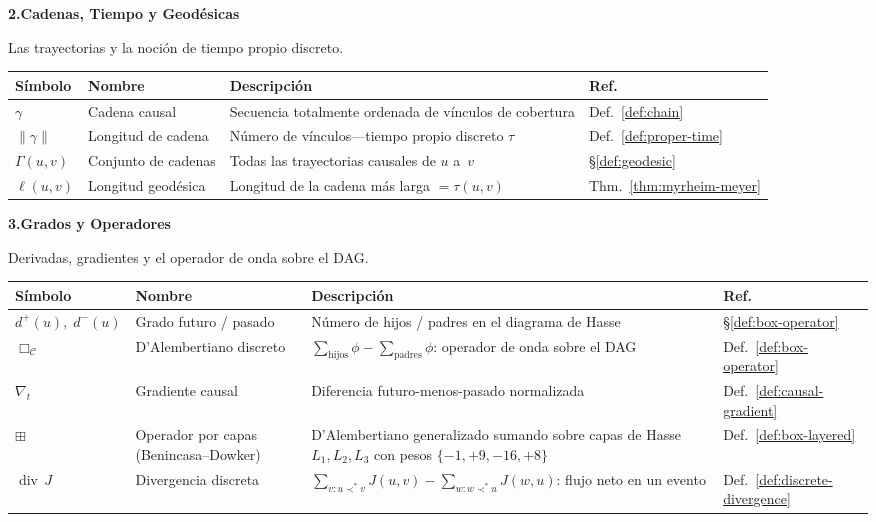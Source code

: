 \documentclass[11pt, a4paper, openany]{book}
\newcommand{\covers}{\prec^{\!*}}
\newcommand{\boxlayer}{\boxplus}  %
\begin{document}
\bigskip

{\bfseries\color{structure} 2.\quad Cadenas, Tiempo y Geod\'esicas}

\smallskip\noindent
Las trayectorias y la noci\'on de tiempo propio discreto.

\smallskip
\begin{tabular}{@{}l@{\;\;}l@{\;\;}p{5.2cm}@{\;\;}l@{}}
\toprule
\textbf{S\'imbolo} & \textbf{Nombre} & \textbf{Descripci\'on} & \textbf{Ref.} \\
\midrule
$\gamma$ & Cadena causal &
  Secuencia totalmente ordenada de v\'inculos de cobertura &
  Def.~\ref{def:chain} \\[3pt]
$\|\gamma\|$ & Longitud de cadena &
  N\'umero de v\'inculos---tiempo propio discreto $\tau$ &
  Def.~\ref{def:proper-time} \\[3pt]
$\Gamma(u,v)$ & Conjunto de cadenas &
  Todas las trayectorias causales de $u$ a~$v$ &
  \S\ref{def:geodesic} \\[3pt]
$\ell(u,v)$ & Longitud geod\'esica &
  Longitud de la cadena m\'as larga $= \tau(u,v)$ &
  Thm.~\ref{thm:myrheim-meyer} \\
\bottomrule
\end{tabular}

\bigskip

{\bfseries\color{structure} 3.\quad Grados y Operadores}

\smallskip\noindent
Derivadas, gradientes y el operador de onda sobre el DAG.

\smallskip
\begin{tabular}{@{}l@{\;\;}l@{\;\;}p{5.2cm}@{\;\;}l@{}}
\toprule
\textbf{S\'imbolo} & \textbf{Nombre} & \textbf{Descripci\'on} & \textbf{Ref.} \\
\midrule
$d^+(u),\; d^-(u)$ & Grado futuro / pasado &
  N\'umero de hijos / padres en el diagrama de Hasse &
  \S\ref{def:box-operator} \\[3pt]
$\Box_{\mathcal{C}}$ & D'Alembertiano discreto &
  $\sum_{\text{hijos}}\phi - \sum_{\text{padres}}\phi$:
  operador de onda sobre el DAG &
  Def.~\ref{def:box-operator} \\[3pt]
$\nabla_t$ & Gradiente causal &
  Diferencia futuro-menos-pasado normalizada &
  Def.~\ref{def:causal-gradient} \\[3pt]
$\boxlayer$ & Operador por capas (Benincasa--Dowker) &
  D'Alembertiano generalizado sumando sobre capas de Hasse
  $L_1, L_2, L_3$ con pesos $\{-1,+9,-16,+8\}$ &
  Def.~\ref{def:box-layered} \\[3pt]
$\operatorname{div}\,J$ & Divergencia discreta &
  $\sum_{v: u\covers v} J(u,v) - \sum_{w: w\covers u} J(w,u)$:
  flujo neto en un evento &
  Def.~\ref{def:discrete-divergence} \\
\bottomrule
\end{tabular}
\end{document}
